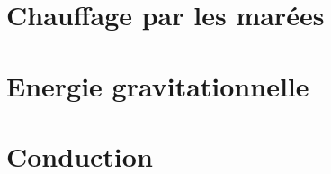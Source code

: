 \documentclass[a4paper,DIV16,10pt]{scrartcl}
\begin{document}
 \inidoc


\newpage
\section{Chauffage par les marées}


\newpage
\section{Energie gravitationnelle}


\newpage
\section{Conduction}


%
\end{document}

